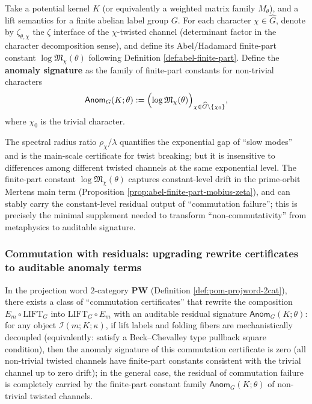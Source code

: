 \begin{definition}\label{def:pom-anom-signature}
Take a potential kernel \(K\) (or equivalently a weighted matrix family \(M_\theta\)), and a lift semantics for a finite abelian label group \(G\).
For each character \(\chi\in\widehat G\), denote by \(\zeta_{\theta,\chi}\) the \(\zeta\) interface of the \(\chi\)-twisted channel (determinant factor in the character decomposition sense), and define its Abel/Hadamard finite-part constant \(\log\mathfrak{M}_\chi(\theta)\) following Definition \ref{def:abel-finite-part}.
Define the \textbf{anomaly signature} as the family of finite-part constants for non-trivial characters
$$
\mathsf{Anom}_{G}(K;\theta)
:=\Bigl(\log\mathfrak{M}_\chi(\theta)\Bigr)_{\chi\in\widehat G\setminus\{\chi_0\}},
$$
where \(\chi_0\) is the trivial character.
\end{definition}

\begin{remark}\label{rem:pom-anom-why-finite-part}
The spectral radius ratio \(\rho_\chi/\lambda\) quantifies the exponential gap of ``slow modes'' and is the main-scale certificate for twist breaking; but it is insensitive to differences among different twisted channels at the same exponential level.
The finite-part constant \(\log\mathfrak{M}_\chi(\theta)\) captures constant-level drift in the prime-orbit Mertens main term (Proposition \ref{prop:abel-finite-part-mobius-zeta}), and can stably carry the constant-level residual output of ``commutation failure''; this is precisely the minimal supplement needed to transform ``non-commutativity'' from metaphysics to auditable signature.
\end{remark}

\subsubsection{Commutation with residuals: upgrading rewrite certificates to auditable anomaly terms}\label{subsec:pom-residual-swap}

\begin{proposition}\label{prop:pom-em-lift-residual-swap}
In the projection word $2$-category \(\mathbf{PW}\) (Definition \ref{def:pom-projword-2cat}), there exists a class of ``commutation certificates'' that rewrite the composition
\(
E_m\circ \mathrm{LIFT}_G
\)
into
\(
\mathrm{LIFT}_G\circ E_m
\)
with an auditable residual signature \(\mathsf{Anom}_G(K;\theta)\):
for any object \(\mathcal{I}(m;K;\kappa)\), if lift labels and folding fibers are mechanistically decoupled (equivalently: satisfy a Beck--Chevalley type pullback square condition), then the anomaly signature of this commutation certificate is zero (all non-trivial twisted channels have finite-part constants consistent with the trivial channel up to zero drift); in the general case, the residual of commutation failure is completely carried by the finite-part constant family \(\mathsf{Anom}_G(K;\theta)\) of non-trivial twisted channels.
\end{proposition}

